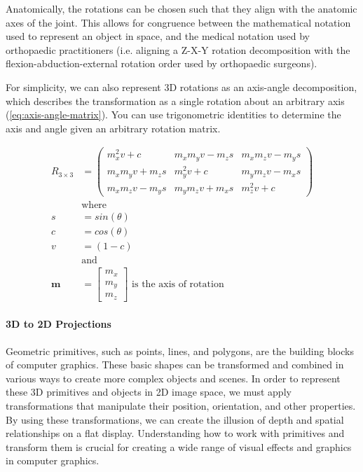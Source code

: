 Anatomically, the rotations can be chosen such that they align with the anatomic axes of the joint. This allows for congruence between the mathematical notation used to represent an object in space, and the medical notation used by orthopaedic practitioners (i.e. aligning a Z-X-Y rotation decomposition with the flexion-abduction-external rotation order used by orthopaedic surgeons).

For simplicity, we can also represent 3D rotations as an axis-angle decomposition, which describes the transformation as a single rotation about an arbitrary axis \cite{craneKinematicAnalysisRobot2008} (\cref{eq:axis-angle-matrix}). You can use trigonometric identities to determine the axis and angle given an arbitrary rotation matrix.

\begin{equation}
    \begin{aligned}
        R_{3 \times 3} &= \begin{pmatrix}
            m_x^2v + c & m_xm_yv - m_zs & m_x m_z v - m_y s \\ m_x m_y v + m_z s & m_y^2 v + c & m_y m_z v - m_x s \\ m_x m_z v - m_y s & m_y m_z v + m_x s & m_z^2 v + c
        \end{pmatrix}\\
        &\text{where} \\
        s &= sin(\theta)\\
        c &= cos(\theta) \\
        v &= (1 - c) \\
        &\text{and}\\
        \mathbf{m} &= \begin{bmatrix}
            m_x \\ m_y \\ m_z
        \end{bmatrix} \text{ is the axis of rotation}
    \end{aligned}
    \label{eq:axis-angle-matrix}
\end{equation}



\paragraph*{3D to 2D Projections}
Geometric primitives, such as points, lines, and polygons, are the building blocks of computer graphics. These basic shapes can be transformed and combined in various ways to create more complex objects and scenes. In order to represent these 3D primitives and objects in 2D image space, we must apply transformations that manipulate their position, orientation, and other properties. By using these transformations, we can create the illusion of depth and spatial relationships on a flat display. Understanding how to work with primitives and transform them is crucial for creating a wide range of visual effects and graphics in computer graphics.

